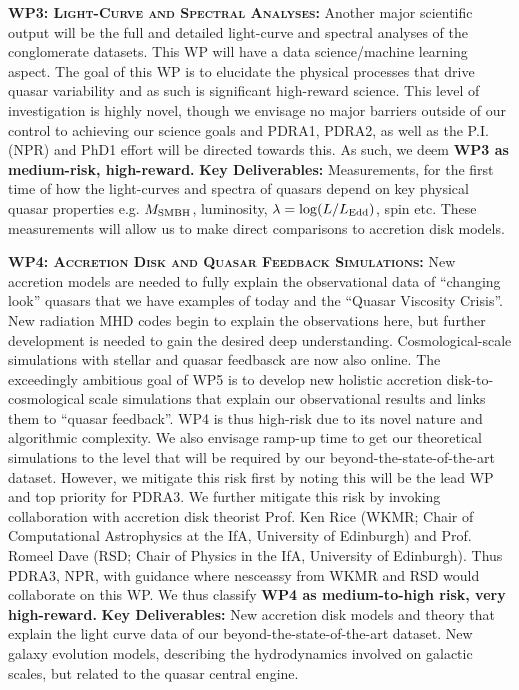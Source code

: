 \documentclass[oneside, a4paper, onecolumn, 11pt]{article}
\begin{document}
\smallskip
\smallskip
\noindent
\textbf{\textsc{WP3: Light-Curve and Spectral Analyses:}} 
Another major scientific output will be the full and detailed light-curve
and spectral analyses of the conglomerate datasets. 
This WP will have a data science/machine learning aspect.  The goal of this WP is to elucidate
the physical processes that drive quasar variability and as such is significant high-reward science.  
%
This level of investigation is highly novel, though we envisage no
major barriers outside of our control to achieving our science goals
and PDRA1, PDRA2, as well as the P.I. (NPR) and PhD1 effort will be
directed towards this.
%
As such, we deem 
{\bf WP3 as medium-risk, high-reward.}  {\bf Key Deliverables:}
Measurements, for the first time of how the light-curves and spectra
of quasars depend on key physical quasar properties e.g. $M_{\rm
SMBH}$, luminosity, $\lambda = \log (L / L_{\rm Edd})$, spin etc.
These measurements will allow us to make direct comparisons to
accretion disk models.


\smallskip
\smallskip
\noindent
\textbf{\textsc{WP4: Accretion Disk and Quasar Feedback Simulations:}} 
New accretion models are needed to fully explain the observational
data of ``changing look'' quasars that we have examples of today and
the ``Quasar Viscosity Crisis''. New radiation MHD codes begin to
explain the observations here, but further development is needed to
gain the desired deep understanding. Cosmological-scale 
simulations with stellar and quasar feedbasck are now also online. The
exceedingly ambitious goal of WP5 is to develop new holistic accretion
disk-to-cosmological scale simulations that explain our observational
results and links them to ``quasar feedback''.  WP4 is thus high-risk
due to its novel nature and algorithmic complexity.  We also envisage
ramp-up time to get our theoretical simulations to the level that will
be required by our beyond-the-state-of-the-art dataset.  However, we
mitigate this risk first by noting this will be the lead WP and top
priority for PDRA3.  We further mitigate this risk by invoking
collaboration with accretion disk theorist Prof. Ken Rice (WKMR; Chair
of Computational Astrophysics at the IfA, University of Edinburgh) and
Prof. Romeel Dave (RSD; Chair of Physics in the IfA, University of
Edinburgh).
Thus PDRA3, NPR, with guidance where nesceassy from
WKMR and RSD would collaborate on this WP.  We thus classify {\bf WP4
as medium-to-high risk, very high-reward.}  {\bf Key Deliverables:}
New accretion disk models and theory that explain the light curve data
of our beyond-the-state-of-the-art dataset.  New galaxy evolution
models, describing the hydrodynamics involved on galactic scales, but
related to the quasar central engine.
\end{document}

